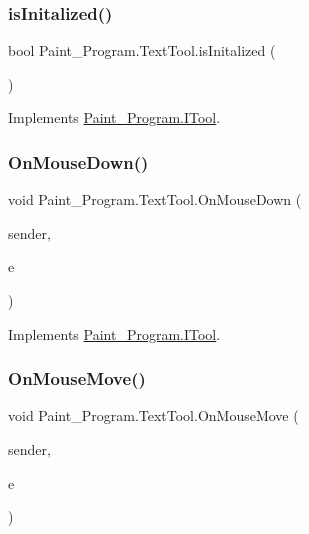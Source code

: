\subsubsection{\texorpdfstring{is\+Initalized()}{isInitalized()}}
{\footnotesize\ttfamily bool Paint\+\_\+\+Program.\+Text\+Tool.\+is\+Initalized (\begin{DoxyParamCaption}{ }\end{DoxyParamCaption})\hspace{0.3cm}{\ttfamily [inline]}}



Implements \mbox{\hyperlink{interface_paint___program_1_1_i_tool_a951b844bcbf47a6c306104fa86be7a5d}{Paint\+\_\+\+Program.\+I\+Tool}}.

\mbox{\label{class_paint___program_1_1_text_tool_a56294ea8e94d8aa58282660c24eb74bb}} 
\subsubsection{\texorpdfstring{On\+Mouse\+Down()}{OnMouseDown()}}
{\footnotesize\ttfamily void Paint\+\_\+\+Program.\+Text\+Tool.\+On\+Mouse\+Down (\begin{DoxyParamCaption}\item[{object}]{sender,  }\item[{Mouse\+Event\+Args}]{e }\end{DoxyParamCaption})\hspace{0.3cm}{\ttfamily [inline]}}



Implements \mbox{\hyperlink{interface_paint___program_1_1_i_tool_a73d8797f4f2b1e0d8efe8aadcd44e840}{Paint\+\_\+\+Program.\+I\+Tool}}.

\mbox{\label{class_paint___program_1_1_text_tool_a25bd60db2eeff1a131bce076e7f68757}} 
\subsubsection{\texorpdfstring{On\+Mouse\+Move()}{OnMouseMove()}}
{\footnotesize\ttfamily void Paint\+\_\+\+Program.\+Text\+Tool.\+On\+Mouse\+Move (\begin{DoxyParamCaption}\item[{object}]{sender,  }\item[{Mouse\+Event\+Args}]{e }\end{DoxyParamCaption})\hspace{0.3cm}{\ttfamily [inline]}}



